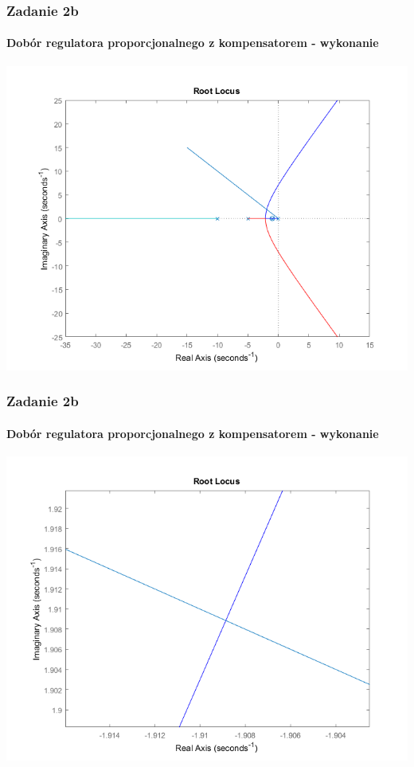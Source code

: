 \documentclass{beamer}
\begin{document}
\begin{frame}\frametitle{Zadanie 2b}\framesubtitle{Dobór regulatora proporcjonalnego z kompensatorem - wykonanie}
\centering	\includegraphics[scale=0.5]{b-rlocus.png}
\end{frame}

\begin{frame}\frametitle{Zadanie 2b}\framesubtitle{Dobór regulatora proporcjonalnego z kompensatorem - wykonanie}
\centering	\includegraphics[scale=0.5]{b-przyblizenie.png}
\end{frame}
\end{document}
